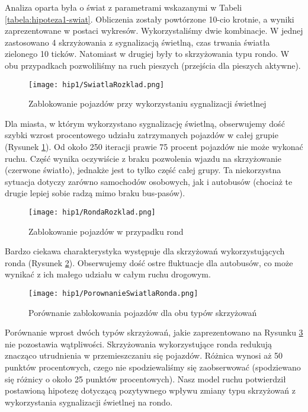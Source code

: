 \documentclass{article}
\begin{document}
Analiza oparta była o świat z parametrami wskazanymi w Tabeli \ref{tabela:hipoteza1-swiat}. Obliczenia zostały powtórzone 10-cio krotnie, a wyniki zaprezentowane w postaci wykresów. Wykorzystaliśmy dwie kombinacje. W jednej zastosowano 4 skrzyżowania z sygnalizacją świetlną, czas trwania światła zielonego 10 ticków. Natomiast w drugiej były to skrzyżowania typu rondo. W obu przypadkach pozwoliliśmy na ruch pieszych (przejścia dla pieszych aktywne).

\begin{figure}[!h]
\centering
    \texttt{[image: hip1/SwiatlaRozklad.png]}
    \caption{Zablokowanie pojazdów przy wykorzystaniu sygnalizacji świetlnej}
    \label{fig:swiatla-rozklad}
\end{figure}

Dla miasta, w którym wykorzystano sygnalizację świetlną, obserwujemy dość szybki wzrost procentowego udziału zatrzymanych pojazdów w całej grupie (Rysunek \ref{fig:swiatla-rozklad}). Od około 250 iteracji prawie 75 procent pojazdów nie może wykonać ruchu. Część wynika oczywiście z braku pozwolenia wjazdu na skrzyżowanie (czerwone światło), jednakże jest to tylko część całej grupy.
Ta niekorzystna sytuacja dotyczy zarówno samochodów osobowych, jak i autobusów (chociaż te drugie lepiej sobie radzą mimo braku bus-pasów).

\begin{figure}[!h]
\centering
    \texttt{[image: hip1/RondaRozklad.png]}
    \caption{Zablokowanie pojazdów w przypadku rond}
    \label{fig:ronda-rozklad}
\end{figure}

Bardzo ciekawa charakterystyka występuje dla skrzyżowań wykorzystujących ronda (Rysunek \ref{fig:ronda-rozklad}). Obserwujemy dość ostre fluktuacje dla autobusów, co może wynikać z ich małego udziału w całym ruchu drogowym.

\begin{figure}[!h]
\centering
    \texttt{[image: hip1/PorownanieSwiatlaRonda.png]}
    \caption{Porównanie zablokowania pojazdów dla obu typów skrzyżowań}
    \label{fig:porownanie-skrzyzowan}
\end{figure}

Porównanie wprost dwóch typów skrzyżowań, jakie zaprezentowano na Rysunku \ref{fig:porownanie-skrzyzowan} nie pozostawia wątpliwości. Skrzyżowania wykorzystujące ronda redukują znacząco utrudnienia w przemieszczaniu się pojazdów. Różnica wynosi aż 50 punktów procentowych, czego nie spodziewaliśmy się zaobserwować (spodziewano się różnicy o około 25 punktów procentowych). Nasz model ruchu potwierdził postawioną hipotezę dotyczącą pozytywnego wpływu zmiany typu skrzyżowań z wykorzystania sygnalizacji świetlnej na rondo.
\end{document}
